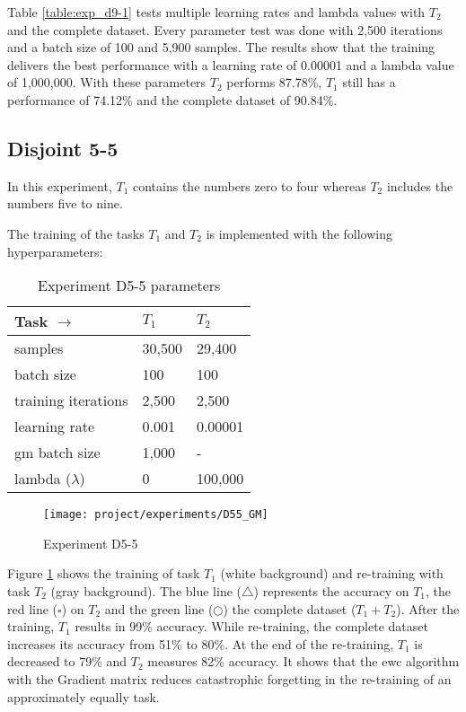 Table \ref{table:exp_d9-1} tests multiple learning rates and lambda values with $T_2$ and the complete dataset.
Every parameter test was done with 2,500 iterations and a batch size of 100 and 5,900 samples.
\newline
The results show that the training delivers the best performance with a learning rate of 0.00001 and a lambda value of 1,000,000.
With these parameters $T_2$ performs 87.78\%, $T_1$ still has a performance of 74.12\% and the complete dataset of 90.84\%.

\subsection{Disjoint 5-5}

In this experiment, $T_1$ contains the numbers zero to four whereas $T_2$ includes the numbers five to nine.

The training of the tasks $T_1$ and $T_2$ is implemented with the following hyperparameters:

\begin{table}[H]
    \centering
    \begin{tabular}{ |l|l|l|  }
        \hline
        Task $\to$ & $T_1$ & $T_2$ \\
        \hline\hline
        samples & 30,500 & 29,400 \\
        \hline
        batch size & 100 & 100 \\
        \hline
        training iterations & 2,500 & 2,500 \\
        \hline
        learning rate & 0.001 & 0.00001 \\
        \hline
        \acrshort{gm} batch size & 1,000 & - \\
        \hline
        lambda ($\lambda$) & 0 & 100,000 \\
        \hline
    \end{tabular}
    \caption{Experiment D5-5 parameters}
    \label{table:exp_d55_params}
\end{table}

\begin{figure}[H]
    \centering
    \texttt{[image: project/experiments/D55\_GM]}
    \caption{Experiment D5-5}
    \label{fig:exp_d5-5_bs1k}
\end{figure}

Figure \ref{fig:exp_d5-5_bs1k} shows the training of task $T_1$ (white background) and re-training with task $T_2$ (gray background).
The blue line ($\triangle$) represents the accuracy on $T_1$, the red line ($\square$) on $T_2$ and the green line ($\bigcirc$) the complete dataset ($T_1 + T_2$).
After the training, $T_1$ results in 99\% accuracy.
While re-training, the complete dataset increases its accuracy from 51\% to 80\%.
At the end of the re-training, $T_1$ is decreased to 79\% and $T_2$ measures 82\% accuracy.
It shows that the \acrshort{ewc} algorithm with the Gradient matrix reduces catastrophic forgetting in the re-training of an approximately equally task.

